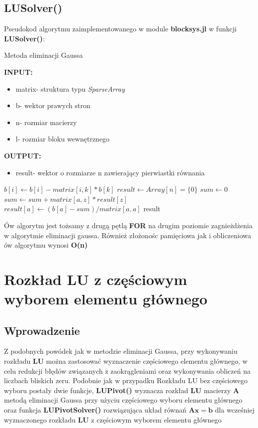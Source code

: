 \documentclass[a4paper,14pt]{report}
\begin{document}
  \section{LUSolver()}
  Pseudokod algorytmu zaimplementowanego w module \textbf{blocksys.jl} w funkcji \textbf{LUSolver()}:
  \begin{algorithm}[H]
    \caption{Metoda eliminacji Gaussa}
    \textbf{INPUT:}
    \begin{itemize}
      \item matrix- struktura typu \textit{SparseArray}
      \item b- wektor prawych stron 
      \item n- rozmiar macierzy
      \item l- rozmiar bloku wewnętrznego
    \end{itemize}
    \textbf{OUTPUT:}
    \begin{itemize}
      \item result- wektor o rozmiarze n zawierający pierwiastki równania
    \end{itemize}
    \begin{algorithmic} 
          \STATE $b[i] \leftarrow b[i]-matrix[i,k]*b[k]$
        \ENDFOR
        \STATE $result \leftarrow Array[n]=\{0\}$
          \STATE $sum \leftarrow 0$
            \STATE $sum \leftarrow sum+matrix[a,z]*result[z]$
          \ENDFOR
          \STATE $result[a] \leftarrow (b[a]-sum)/matrix[a,a]$
        \ENDFOR
      \ENDFOR
      \RETURN result
      \end{algorithmic}
  \end{algorithm}
  Ów algorytm jest tożsamy z drugą pętlą \textbf{FOR} na drugim poziomie zagnieżdżenia w algorytmie eliminacji gaussa. Również złożonośc pamięciowa jak i obliczeniowa ów algorytmu wynosi \textbf{O(n)}




\chapter{Rozkład LU z częściowym wyborem elementu głównego}
  \section{Wprowadzenie}
  Z podobnych powódek jak w metodzie eliminacji Gaussa, przy wykonywaniu rozkładu \textbf{LU} można zastosować wyznaczenie częściowego elementu głównego, w celu redukcji błędów związanych z zaokrągleniami oraz wykonywania obliczeń na liczbach bliskich zeru. Podobnie jak w przypadku Rozkładu LU bez częściowego wyboru postały dwie funkcje, \textbf{LUPivot()} wyznacza rozkład \textbf{LU} macierzy \textbf{A} metodą eliminacji Gaussa przy użyciu częściowego wyboru elementu głównego oraz funkcja \textbf{LUPivotSolver()} rozwiązująca układ równań $\mathbf{Ax=b}$ dla wcześniej wyznaczonego rozkładu \textbf{LU} z częściowym wyborem elementu głównego\\
\end{document}
